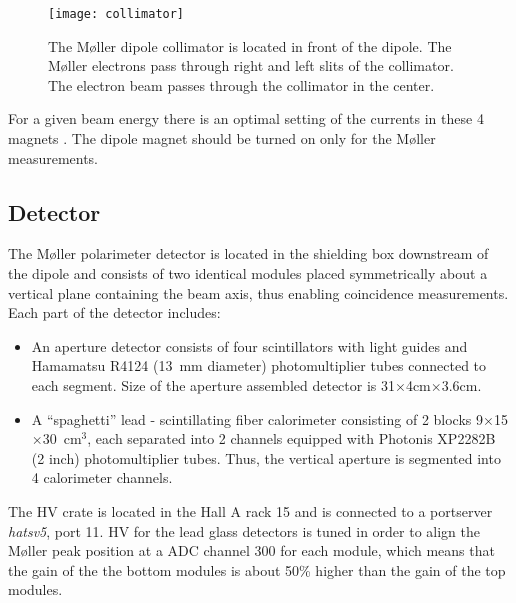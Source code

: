 {{   \begin{figure}%
      \begin{center}
          \texttt{[image: collimator]}
      \end{center}
      \caption[M{\o}ller:collimator]{The M{\o}ller dipole collimator is located in front 
              of the dipole. The M{\o}ller electrons pass through  right and left 
             slits of the collimator. The electron beam passes through the collimator 
             in the  center.  
            }
      \label{fig:moller_collimator} 
   \end{figure}  
}

For a given beam energy there is an optimal setting of the currents in 
these 4 magnets%
.
The dipole magnet should be turned on
only for the M{\o}ller measurements. 

\subsection {Detector}
\label{sec:moller_compon_det}

The M{\o}ller polarimeter detector is located in the shielding box downstream 
of the dipole and consists of two identical modules placed symmetrically about a vertical
plane containing the beam axis, thus enabling   
coincidence measurements.
Each part of the detector includes:
\begin{itemize}
  \item An aperture detector consists of four  
        scintillators with light guides and  Hamamatsu R4124 (13~mm diameter)
        photomultiplier tubes connected to each segment. Size of the aperture 
        assembled detector is 31$\times$4cm$\times$3.6cm.
  \item A ``spaghetti'' lead - scintillating fiber calorimeter
        consisting of 2 blocks 9$\times$15$\times$30~cm$^3$, each separated into 2
        channels equipped with Photonis XP2282B (2 inch) photomultiplier tubes. Thus,
        the vertical aperture is segmented into 4 calorimeter channels.
\end{itemize}
The HV crate is located in the Hall A rack 15 and is connected
to a portserver {\em hatsv5}, port 11.
HV for the lead glass detectors is tuned in order to align the M{\o}ller peak
position at a ADC channel 300 for each module, which means that the gain
of the the bottom modules is about 50\% higher than the gain of the top
modules.

}
